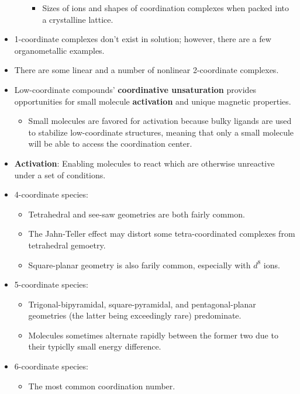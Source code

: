 \documentclass[../notes.tex]{subfiles}
\begin{document}
\begin{itemize}
\begin{enumerate}
\begin{itemize}[label={\scriptsize$\blacksquare$}]
            \item Sizes of ions and shapes of coordination complexes when packed into a crystalline lattice.
        \end{itemize}
    \end{enumerate}
    \item 1-coordinate complexes don't exist in solution; however, there are a few organometallic examples.
    \item There are some linear and a number of nonlinear 2-coordinate complexes.
    \item Low-coordinate compounds' \textbf{coordinative unsaturation} provides opportunities for small molecule \textbf{activation} and unique magnetic properties.
    \begin{itemize}
        \item Small molecules are favored for activation because bulky ligands are used to stabilize low-coordinate structures, meaning that only a small molecule will be able to access the coordination center.
    \end{itemize}
    \item \textbf{Activation}: Enabling molecules to react which are otherwise unreactive under a set of conditions.
    \item 4-coordinate species:
    \begin{itemize}
        \item Tetrahedral and see-saw geometries are both fairly common.
        \item The Jahn-Teller effect may distort some tetra-coordinated complexes from tetrahedral gemoetry.
        \item Square-planar geometry is also farily common, especially with $d^8$ ions.
    \end{itemize}
    \item 5-coordinate species:
    \begin{itemize}
        \item Trigonal-bipyramidal, square-pyramidal, and pentagonal-planar geometries (the latter being exceedingly rare) predominate.
        \item Molecules sometimes alternate rapidly between the former two due to their typiclly small energy difference.
    \end{itemize}
    \item 6-coordinate species:
    \begin{itemize}
        \item The most common coordination number.

\end{itemize}
\end{itemize}
\end{document}
